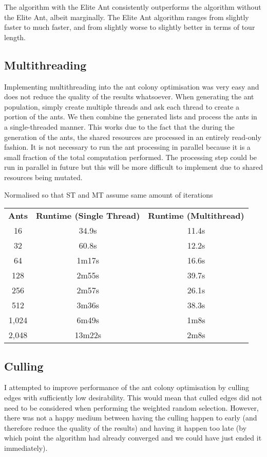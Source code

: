 \documentclass[a4paper, 11pt,table]{article}
\begin{document}
The algorithm with the Elite Ant consistently outperforms the algorithm without the Elite Ant, albeit marginally. The Elite Ant algorithm ranges from slightly faster to much faster, and from slightly worse to slightly better in terms of tour length.

\subsection{Multithreading}
Implementing multithreading into the ant colony optimisation was very easy and does not reduce the quality of the results whatsoever. When generating the ant population, simply create multiple threads and ask each thread to create a portion of the ants. We then combine the generated lists and process the ants in a single-threaded manner. This works due to the fact that the during the generation of the ants, the shared resources are processed in an entirely read-only fashion. It is not necessary to run the ant processing in parallel because it is a small fraction of the total computation performed. The processing step could be run in parallel in future but this will be more difficult to implement due to shared resources being mutated.

\begin{center}
	Normalised so that ST and MT assume same amount of iterations
	
	\begin{tabu}{|c c c|}
		\textbf{Ants} & \textbf{Runtime (Single Thread)} & \textbf{Runtime (Multithread)}\\
		16 & 34.9s & 11.4s\\
		32 & 60.8s & 12.2s\\
		64 & 1m17s & 16.6s\\
		128 & 2m55s & 39.7s\\
		256 & 2m57s & 26.1s\\
		512 & 3m36s & 38.3s \\
		1,024 & 6m49s & 1m8s \\
		2,048 & 13m22s & 2m8s \\
	\end{tabu}
\end{center}

\subsection{Culling}
I attempted to improve performance of the ant colony optimisation by culling edges with sufficiently low desirability. This would mean that culled edges did not need to be considered when performing the weighted random selection. However, there was not a happy medium between having the culling happen to early (and therefore reduce the quality of the results) and having it happen too late (by which point the algorithm had already converged and we could have just ended it immediately).
\end{document}
